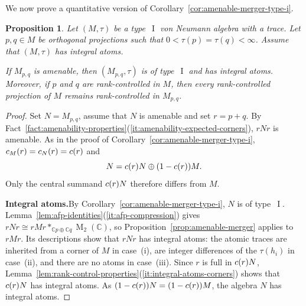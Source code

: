 \documentclass[11pt]{amsart}
\makeatletter
\numberwithin{equation}{section}
\newcommand{\cc}{\mathbb C}
\DeclareMathOperator{\I}{I}
\newcommand{\rM}{\operatorname{M}}
\newcommand{\@optsub}[1]{\if\relax\detokenize{#1}\relax\else_{#1}\fi}
\newcommand{\csupp}[2][]{c\@optsub{#1}(#2)}
\newtheorem{Prop}[The]{Proposition}
\theoremstyle{definition}
\makeatother
\begin{document}
We now prove a quantitative version of Corollary~\ref{cor:amenable-merger-type-i}.

\begin{Prop}
    \label{prop:amenable-free-merger}
    Let $(M,\tau)$ be a type~$\I$ von Neumann algebra with a trace.  Let $p,q\in M$ be orthogonal projections such that $0<\tau(p)=\tau(q)<\infty$. Assume that $(M,\tau)$ has integral atoms.


    If $M_{p,q}$ is amenable, then $(M_{p,q},\tau)$ is of type~$\I$ and has integral atoms. Moreover, if $p$ and $q$ are rank-controlled in $M$, then every rank-controlled projection of $M$ remains rank-controlled in $M_{p,q}$.
\end{Prop}



\begin{proof}
 Set $N=M_{p,q}$, assume that $N$ is amenable and set $r=p+q$. By Fact~\ref{fact:amenability-properties}\textup{(\ref*{it:amenability-expected-corners})}, $rNr$ is amenable. As in the proof of Corollary~\ref{cor:amenable-merger-type-i}, $\csupp[M]{r}=\csupp[N]{r}=\csupp{r}$ and
    \begin{equation}\label{eq:merger-central-decomposition}
        N=\csupp{r}N\oplus(1-\csupp{r})M.
    \end{equation}
    Only the central summand $\csupp{r}N$ therefore differs from $M$.

    \smallskip
    \noindent\textbf{Integral atoms.}\enspace By Corollary~\ref{cor:amenable-merger-type-i}, $N$ is of type~$\I$. Lemma~\ref{lem:afp-identities}\textup{(\ref*{it:afp-compression})} gives $rNr\cong rMr\ast_{\cc p\oplus\cc q}\rM_2(\cc)$, so Proposition~\ref{prop:amenable-merger} applies to $rMr$. Its descriptions show that $rNr$ has integral atoms: the atomic traces are inherited from a corner of $M$ in case~\textup{(i)}, are integer differences of the $\tau(h_i)$ in case~\textup{(ii)}, and there are no atoms in case~\textup{(iii)}. Since $r$ is full in $\csupp{r}N$, Lemma~\ref{lem:rank-control-properties}\textup{(\ref*{it:integral-atoms-corners})} shows that $\csupp{r}N$ has integral atoms. As $(1-\csupp{r})N=(1-\csupp{r})M$, the algebra $N$ has integral atoms.


\end{proof}
\end{document}
